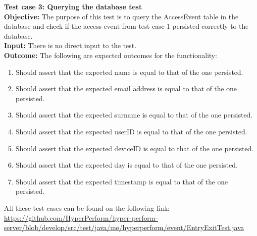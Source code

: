 \documentclass[11pt,a4paper]{article}
\begin{document}
\noindent
\textbf{Test case 3: Querying the database test} \\
\textbf{Objective: } The purpose of this test is to query the AccessEvent table in the database and check if the access event from test case 1 persisted correctly to the database. \\
\textbf{Input: } There is no direct input to the test. \\
\textbf{Outcome: } The following are expected outcomes for the functionality:
\begin{enumerate}
	\item Should assert that the expected name is equal to that of the one persisted.
	\item Should assert that the expected email address is equal to that of the one persisted.
	\item Should assert that the expected surname is equal to that of the one persisted.
	\item Should assert that the expected userID is equal to that of the one persisted.
	\item Should assert that the expected deviceID is equal to that of the one persisted.
	\item Should assert that the expected day is equal to that of the one persisted.
	\item Should assert that the expected timestamp is equal to that of the one persisted.\\
\end{enumerate}

All these test cases can be found on the following link:
\url{https://github.com/HyperPerform/hyper-perform-server/blob/develop/src/test/java/me/hyperperform/event/EntryExitTest.java}
\end{document}
